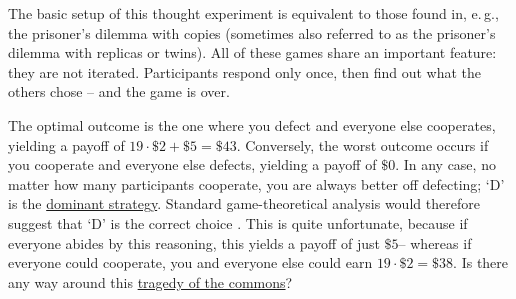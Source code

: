 The basic setup of this thought experiment is equivalent to those found
in, e.\,g., the prisoner's dilemma with copies (sometimes also referred to
as the prisoner's dilemma with replicas or twins). All of these games
share an important feature: they are not iterated. Participants respond
only once, then find out what the others chose -- and the game is over.

The optimal outcome is the one where you defect and everyone else
cooperates, yielding a payoff of \(19 \cdot \$ 2 + \$ 5 = \$ 43\).
Conversely, the worst outcome occurs if you cooperate and everyone else
defects, yielding a payoff of \(\$ 0\). In any case, no matter how many
participants cooperate, you are always better off defecting; `D' is the
\href{https://en.wikipedia.org/wiki/Strategic_dominance}{dominant
strategy}. Standard game-theoretical analysis would therefore suggest
that `D' is the correct choice
\parencite{Binmore2007-uc,Osborne2004-ui}. This is quite
unfortunate, because if everyone abides by this reasoning, this yields a
payoff of just \(\$ 5\)-- whereas if everyone could cooperate, you and
everyone else could earn \(19 \cdot \$ 2 = \$ 38\). Is there any way
around this
\href{https://en.wikipedia.org/wiki/Tragedy_of_the_commons}{tragedy
of the commons}?


